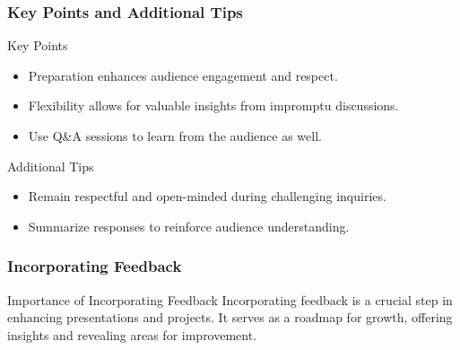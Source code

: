 \documentclass[aspectratio=169]{beamer}
\begin{document}
\begin{frame}[fragile]
    \frametitle{Key Points and Additional Tips}
    \begin{block}{Key Points}
        \begin{itemize}
            \item Preparation enhances audience engagement and respect.
            \item Flexibility allows for valuable insights from impromptu discussions.
            \item Use Q\&A sessions to learn from the audience as well.
        \end{itemize}
    \end{block}
    
    \begin{block}{Additional Tips}
        \begin{itemize}
            \item Remain respectful and open-minded during challenging inquiries.
            \item Summarize responses to reinforce audience understanding.
        \end{itemize}
    \end{block}
\end{frame}

\begin{frame}[fragile]
    \frametitle{Incorporating Feedback}
    \begin{block}{Importance of Incorporating Feedback}
        Incorporating feedback is a crucial step in enhancing presentations and projects. It serves as a roadmap for growth, offering insights and revealing areas for improvement.
    \end{block}
\end{frame}
\end{document}
